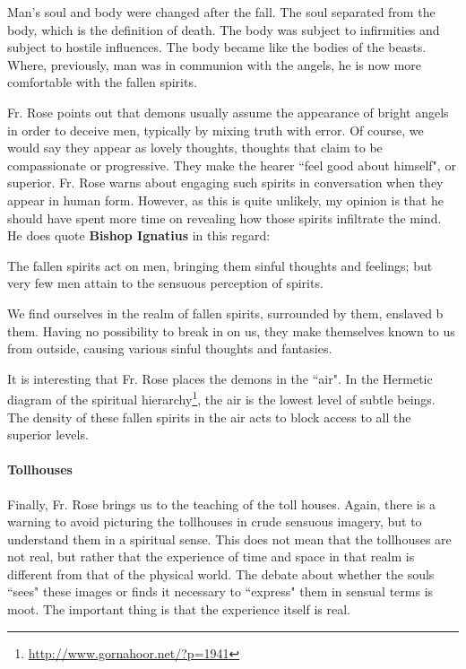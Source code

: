 Man's soul and body were changed after the fall. The soul separated from the body, which is the definition of death. The body was subject to infirmities and subject to hostile influences. The body became like the bodies of the beasts. Where, previously, man was in communion with the angels, he is now more comfortable with the fallen spirits.

Fr. Rose points out that demons usually assume the appearance of bright angels in order to deceive men, typically by mixing truth with error. Of course, we would say they appear as lovely thoughts, thoughts that claim to be compassionate or progressive. They make the hearer ``feel good about himself", or superior. Fr. Rose warns about engaging such spirits in conversation when they appear in human form. However, as this is quite unlikely, my opinion is that he should have spent more time on revealing how those spirits infiltrate the mind. He does quote \textbf{Bishop Ignatius} in this regard:

\begin{quotex}
The fallen spirits act on men, bringing them sinful thoughts and feelings; but very few men attain to the sensuous perception of spirits. 

\end{quotex}
We find ourselves in the realm of fallen spirits, surrounded by them, enslaved b them. Having no possibility to break in on us, they make themselves known to us from outside, causing various sinful thoughts and fantasies.

It is interesting that Fr. Rose places the demons in the ``air". In the Hermetic diagram of the spiritual hierarchy\footnote{\url{http://www.gornahoor.net/?p=1941}}, the air is the lowest level of subtle beings. The density of these fallen spirits in the air acts to block access to all the superior levels.

\paragraph{Tollhouses}
Finally, Fr. Rose brings us to the teaching of the toll houses. Again, there is a warning to avoid picturing the tollhouses in crude sensuous imagery, but to understand them in a spiritual sense. This does not mean that the tollhouses are not real, but rather that the experience of time and space in that realm is different from that of the physical world. The debate about whether the souls ``sees" these images or finds it necessary to ``express" them in sensual terms is moot. The important thing is that the experience itself is real.

